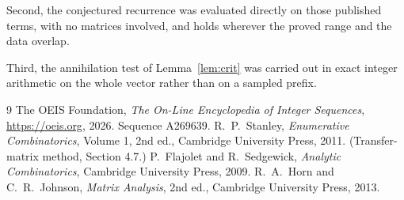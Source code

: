 \documentclass[11pt,a4paper]{article}
\theoremstyle{plain}
\theoremstyle{definition}
\begin{document}
Second, the conjectured recurrence was evaluated directly on those published terms, with no
matrices involved, and holds wherever the proved range and the data overlap.

Third, the annihilation test of Lemma~\ref{lem:crit} was carried out in exact integer
arithmetic on the whole vector rather than on a sampled prefix.

\begin{thebibliography}{9}
 The OEIS Foundation, \emph{The On-Line Encyclopedia of Integer
Sequences}, \url{https://oeis.org}, 2026. Sequence A269639.
 R.~P.~Stanley, \emph{Enumerative Combinatorics}, Volume 1, 2nd ed.,
Cambridge University Press, 2011. (Transfer-matrix method, Section 4.7.)
 P.~Flajolet and R.~Sedgewick, \emph{Analytic Combinatorics}, Cambridge
University Press, 2009.
 R.~A.~Horn and C.~R.~Johnson, \emph{Matrix Analysis}, 2nd ed., Cambridge
University Press, 2013.
\end{thebibliography}
\end{document}
